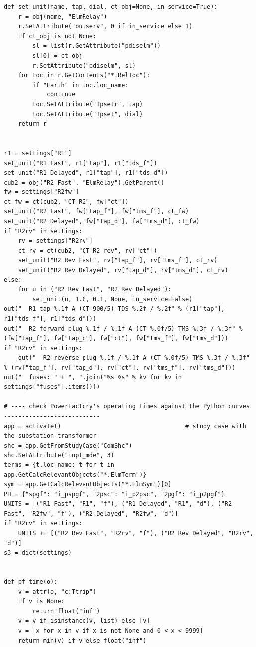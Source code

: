 \documentclass[12pt,a4paper]{article}
\begin{document}
\begin{lstlisting}
def set_unit(name, tap, dial, ct_obj=None, in_service=True):
    r = obj(name, "ElmRelay")
    r.SetAttribute("outserv", 0 if in_service else 1)
    if ct_obj is not None:
        sl = list(r.GetAttribute("pdiselm"))
        sl[0] = ct_obj
        r.SetAttribute("pdiselm", sl)
    for toc in r.GetContents("*.RelToc"):
        if "Earth" in toc.loc_name:
            continue
        toc.SetAttribute("Ipsetr", tap)
        toc.SetAttribute("Tpset", dial)
    return r


r1 = settings["R1"]
set_unit("R1 Fast", r1["tap"], r1["tds_f"])
set_unit("R1 Delayed", r1["tap"], r1["tds_d"])
cub2 = obj("R2 Fast", "ElmRelay").GetParent()
fw = settings["R2fw"]
ct_fw = ct(cub2, "CT R2", fw["ct"])
set_unit("R2 Fast", fw["tap_f"], fw["tms_f"], ct_fw)
set_unit("R2 Delayed", fw["tap_d"], fw["tms_d"], ct_fw)
if "R2rv" in settings:
    rv = settings["R2rv"]
    ct_rv = ct(cub2, "CT R2 rev", rv["ct"])
    set_unit("R2 Rev Fast", rv["tap_f"], rv["tms_f"], ct_rv)
    set_unit("R2 Rev Delayed", rv["tap_d"], rv["tms_d"], ct_rv)
else:
    for u in ("R2 Rev Fast", "R2 Rev Delayed"):
        set_unit(u, 1.0, 0.1, None, in_service=False)
out("  R1 tap %.1f A (CT 900/5) TDS %.2f / %.2f" % (r1["tap"], r1["tds_f"], r1["tds_d"]))
out("  R2 forward plug %.1f / %.1f A (CT %.0f/5) TMS %.3f / %.3f" % (fw["tap_f"], fw["tap_d"], fw["ct"], fw["tms_f"], fw["tms_d"]))
if "R2rv" in settings:
    out("  R2 reverse plug %.1f / %.1f A (CT %.0f/5) TMS %.3f / %.3f" % (rv["tap_f"], rv["tap_d"], rv["ct"], rv["tms_f"], rv["tms_d"]))
out("  fuses: " + ", ".join("%s %s" % kv for kv in settings["fuses"].items()))

# ---- check PowerFactory's operating times against the Python curves ---------------------------
app = activate()                                   # study case with the substation transformer
shc = app.GetFromStudyCase("ComShc")
shc.SetAttribute("iopt_mde", 3)
terms = {t.loc_name: t for t in app.GetCalcRelevantObjects("*.ElmTerm")}
sym = app.GetCalcRelevantObjects("*.ElmSym")[0]
PH = {"spgf": "i_pspgf", "2psc": "i_p2psc", "2pgf": "i_p2pgf"}
UNITS = [("R1 Fast", "R1", "f"), ("R1 Delayed", "R1", "d"), ("R2 Fast", "R2fw", "f"), ("R2 Delayed", "R2fw", "d")]
if "R2rv" in settings:
    UNITS += [("R2 Rev Fast", "R2rv", "f"), ("R2 Rev Delayed", "R2rv", "d")]
s3 = dict(settings)


def pf_time(o):
    v = attr(o, "c:Ttrip")
    if v is None:
        return float("inf")
    v = v if isinstance(v, list) else [v]
    v = [x for x in v if x is not None and 0 < x < 9999]
    return min(v) if v else float("inf")



\end{lstlisting}
\end{document}
